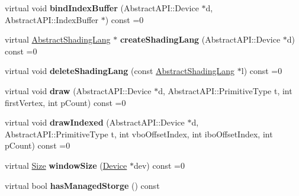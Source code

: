 \begin{DoxyCompactItemize}
\item 
\hypertarget{class_tempest_1_1_abstract_a_p_i_abc16b469cb382c220f5b3b3d41b770ed}{virtual void {\bfseries bind\+Index\+Buffer} (Abstract\+A\+P\+I\+::\+Device $\ast$d, Abstract\+A\+P\+I\+::\+Index\+Buffer $\ast$) const =0}\label{class_tempest_1_1_abstract_a_p_i_abc16b469cb382c220f5b3b3d41b770ed}

\item 
\hypertarget{class_tempest_1_1_abstract_a_p_i_a5c44e8dc0dcd053136f12c0160a02b19}{virtual \hyperlink{class_tempest_1_1_abstract_shading_lang}{Abstract\+Shading\+Lang} $\ast$ {\bfseries create\+Shading\+Lang} (Abstract\+A\+P\+I\+::\+Device $\ast$d) const =0}\label{class_tempest_1_1_abstract_a_p_i_a5c44e8dc0dcd053136f12c0160a02b19}

\item 
\hypertarget{class_tempest_1_1_abstract_a_p_i_a7c217892a2e80505ac1f9976dfcdeca5}{virtual void {\bfseries delete\+Shading\+Lang} (const \hyperlink{class_tempest_1_1_abstract_shading_lang}{Abstract\+Shading\+Lang} $\ast$l) const =0}\label{class_tempest_1_1_abstract_a_p_i_a7c217892a2e80505ac1f9976dfcdeca5}

\item 
\hypertarget{class_tempest_1_1_abstract_a_p_i_a21ee70304424b733fc22d567d5fc2a8b}{virtual void {\bfseries draw} (Abstract\+A\+P\+I\+::\+Device $\ast$d, Abstract\+A\+P\+I\+::\+Primitive\+Type t, int first\+Vertex, int p\+Count) const =0}\label{class_tempest_1_1_abstract_a_p_i_a21ee70304424b733fc22d567d5fc2a8b}

\item 
\hypertarget{class_tempest_1_1_abstract_a_p_i_afc4d33c0d4da947bc0c682c5348affad}{virtual void {\bfseries draw\+Indexed} (Abstract\+A\+P\+I\+::\+Device $\ast$d, Abstract\+A\+P\+I\+::\+Primitive\+Type t, int vbo\+Offset\+Index, int ibo\+Offset\+Index, int p\+Count) const =0}\label{class_tempest_1_1_abstract_a_p_i_afc4d33c0d4da947bc0c682c5348affad}

\item 
\hypertarget{class_tempest_1_1_abstract_a_p_i_a2c5966f646e4a10c79d1d44bd84c786f}{virtual \hyperlink{struct_tempest_1_1_size}{Size} {\bfseries window\+Size} (\hyperlink{class_tempest_1_1_device}{Device} $\ast$dev) const =0}\label{class_tempest_1_1_abstract_a_p_i_a2c5966f646e4a10c79d1d44bd84c786f}

\item 
\hypertarget{class_tempest_1_1_abstract_a_p_i_a7d0b1a35c0e21cd262cabfdeec7807ff}{virtual bool {\bfseries has\+Managed\+Storge} () const }\label{class_tempest_1_1_abstract_a_p_i_a7d0b1a35c0e21cd262cabfdeec7807ff}

\end{DoxyCompactItemize}
